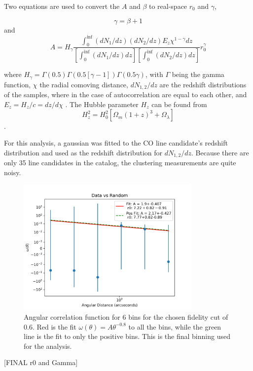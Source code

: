 Two equations are used to convert the $A$ and $\beta$ to real-space $r_0$ and $\gamma$, 

$$ \gamma = \beta + 1 $$ and $$ A = H_{\gamma}\frac{\int_{0}^{\inf} (dN_1/dz)(dN_2/dz)E_z\chi^{1 - \gamma} dz}{[\int_{0}^{\inf} (dN_1/dz)dz][\int_{0}^{\inf} (dN_2/dz)dz]}r_0^{\gamma}$$

where $H_{\gamma} = \Gamma(0.5)\Gamma(0.5[\gamma -1])\Gamma(0.5\gamma)$, with $\Gamma$ being the gamma function, $\chi$ the radial comoving distance, $dN_{1,2}/dz$ are the redshift distributions of the samples, where in the case of autocorrelation are equal to each other, and $E_z = H_z/c = dz/d\chi$ \cite{hickox2011clustering}. The Hubble parameter $H_z$ can be found from
$$H_z^2 = H_0^2[\Omega_m(1+z)^3 + \Omega_{\lambda}]$$ \cite{hickox2011clustering}.

For this analysis, a gaussian was fitted to the CO line candidate's redshift distribution and used as the redshift distribution for $dN_{1,2}/dz$. Because there are only 35 line candidates in the catalog, the clustering measurements are quite noisy. 

\begin{figure}[!tbp]
\centering \includegraphics[width=90mm]{clustering_two/Data_vs_Random_10000_bin6_sn0_6_NFalse.png}
\caption{Angular correlation function for 6 bins for the chosen fidelity cut of 0.6. Red is the fit $\omega(\theta) = A\theta^{-0.8}$ to all the bins, while the green line is the fit to only the positive bins. This is the final binning used for the analysis. }
\label{fig:Angular_binnings}
\end{figure}

[FINAL r0 and Gamma]



